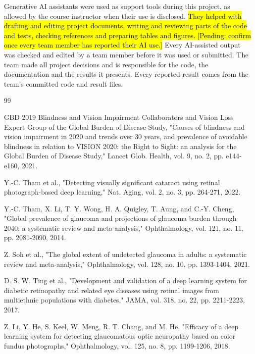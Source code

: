 \documentclass[conference,a4paper]{IEEEtran}
\newcommand{\pendingedit}[1]{\hl{#1}}
\begin{document}
Generative AI assistants were used as support tools during this project, as allowed by the course
instructor when their use is disclosed. \pendingedit{They helped with drafting and editing project documents,
writing and reviewing parts of the code and tests, checking references and preparing tables and
figures. [Pending: confirm once every team member has reported their AI use.]} Every AI-assisted
output was checked and edited by a team member before it was used or submitted. The team made all
project decisions and is responsible for the code, the documentation and the results it presents.
Every reported result comes from the team's committed code and result files.

\begin{thebibliography}{99}


GBD 2019 Blindness and Vision Impairment Collaborators and Vision Loss Expert Group of the Global
Burden of Disease Study, "Causes of blindness and vision impairment in 2020 and trends over 30
years, and prevalence of avoidable blindness in relation to VISION 2020: the Right to Sight: an
analysis for the Global Burden of Disease Study," Lancet Glob. Health, vol. 9, no. 2, pp. e144-e160,
2021.


Y.-C. Tham et al., "Detecting visually significant cataract using retinal photograph-based deep
learning," Nat. Aging, vol. 2, no. 3, pp. 264-271, 2022.


Y.-C. Tham, X. Li, T. Y. Wong, H. A. Quigley, T. Aung, and C.-Y. Cheng, "Global prevalence of
glaucoma and projections of glaucoma burden through 2040: a systematic review and meta-analysis,"
Ophthalmology, vol. 121, no. 11, pp. 2081-2090, 2014.


Z. Soh et al., "The global extent of undetected glaucoma in adults: a systematic review and
meta-analysis," Ophthalmology, vol. 128, no. 10, pp. 1393-1404, 2021.


D. S. W. Ting et al., "Development and validation of a deep learning system for diabetic retinopathy
and related eye diseases using retinal images from multiethnic populations with diabetes," JAMA,
vol. 318, no. 22, pp. 2211-2223, 2017.


Z. Li, Y. He, S. Keel, W. Meng, R. T. Chang, and M. He, "Efficacy of a deep learning system for
detecting glaucomatous optic neuropathy based on color fundus photographs," Ophthalmology, vol. 125,
no. 8, pp. 1199-1206, 2018.


\end{thebibliography}
\end{document}
